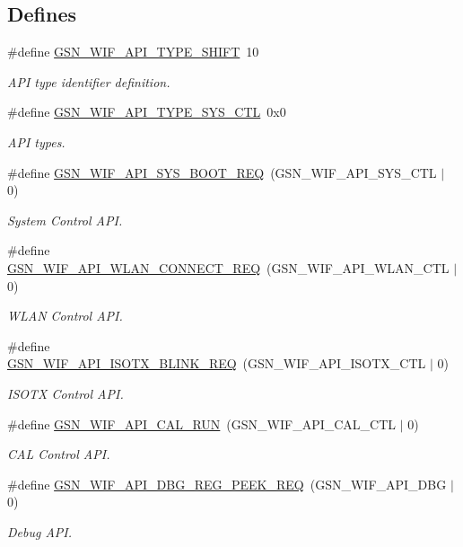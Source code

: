 \subsection*{Defines}
\begin{DoxyCompactItemize}
\item 
\#define \hyperlink{a00636_ga3c3fb4bb2d829ffe7098bdd4ee283a42}{GSN\_\-WIF\_\-API\_\-TYPE\_\-SHIFT}~10
\begin{DoxyCompactList}\small\item\em API type identifier definition. \end{DoxyCompactList}\item 
\#define \hyperlink{a00636_ga1bd275f0a8f47dba99b6e22adcb67ca4}{GSN\_\-WIF\_\-API\_\-TYPE\_\-SYS\_\-CTL}~0x0
\begin{DoxyCompactList}\small\item\em API types. \end{DoxyCompactList}\item 
\#define \hyperlink{a00636_ga35490aa95424208d771f9ce5466c4dc2}{GSN\_\-WIF\_\-API\_\-SYS\_\-BOOT\_\-REQ}~(GSN\_\-WIF\_\-API\_\-SYS\_\-CTL $|$ 0)
\begin{DoxyCompactList}\small\item\em System Control API. \end{DoxyCompactList}\item 
\#define \hyperlink{a00636_ga807417e493752092e13b44e6f31b896e}{GSN\_\-WIF\_\-API\_\-WLAN\_\-CONNECT\_\-REQ}~(GSN\_\-WIF\_\-API\_\-WLAN\_\-CTL $|$ 0)
\begin{DoxyCompactList}\small\item\em WLAN Control API. \end{DoxyCompactList}\item 
\#define \hyperlink{a00636_gaaf48f3ebb3fabb793cc8b5663aff7251}{GSN\_\-WIF\_\-API\_\-ISOTX\_\-BLINK\_\-REQ}~(GSN\_\-WIF\_\-API\_\-ISOTX\_\-CTL $|$ 0)
\begin{DoxyCompactList}\small\item\em ISOTX Control API. \end{DoxyCompactList}\item 
\#define \hyperlink{a00636_ga65249c647288361df35fafec69154f96}{GSN\_\-WIF\_\-API\_\-CAL\_\-RUN}~(GSN\_\-WIF\_\-API\_\-CAL\_\-CTL $|$ 0)
\begin{DoxyCompactList}\small\item\em CAL Control API. \end{DoxyCompactList}\item 
\#define \hyperlink{a00636_ga141fe1f244ec03a374f1efba9524991c}{GSN\_\-WIF\_\-API\_\-DBG\_\-REG\_\-PEEK\_\-REQ}~(GSN\_\-WIF\_\-API\_\-DBG $|$ 0)
\begin{DoxyCompactList}\small\item\em Debug API. \end{DoxyCompactList}\end{DoxyCompactItemize}
